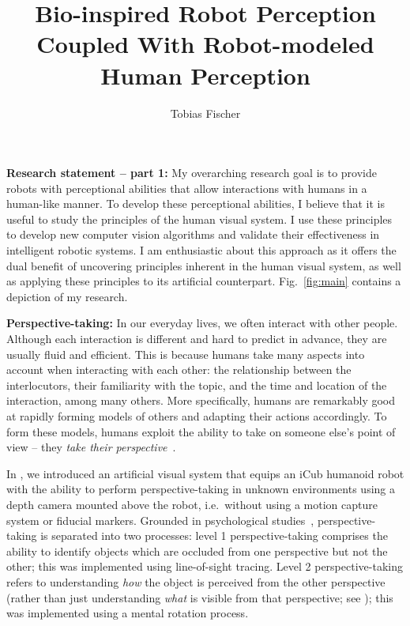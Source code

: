 \documentclass[conference]{IEEEtran}
\begin{document}
%
\title{Bio-inspired Robot Perception\\Coupled With Robot-modeled Human Perception}

%
\author{Tobias Fischer%
}

%
%
%
%
%
%
%
%
%
%
%
%
%
%
%
%


%
%


%
%
%
%
%
%
%
%
%
%
%
%
%
%
%
%


\maketitle

%
%
%

\IEEEpeerreviewmaketitle

%
\textbf{Research statement -- part 1:} My overarching research goal is to provide robots with perceptional abilities that allow interactions with humans in a human-like manner. To develop these perceptional abilities, I believe that it is useful to study the principles of the human visual system. I use these principles to develop new computer vision algorithms and validate their effectiveness in intelligent robotic systems. I am enthusiastic about this approach as it offers the dual benefit of uncovering principles inherent in the human visual system, as well as applying these principles to its artificial counterpart. Fig.~\ref{fig:main} contains a depiction of my research.

\textbf{Perspective-taking:} In our everyday lives, we often interact with other people. Although each interaction is different and hard to predict in advance, they are usually fluid and efficient. This is because humans take many aspects into account when interacting with each other: the relationship between the interlocutors, their familiarity with the topic, and the time and location of the interaction, among many others. More specifically, humans are remarkably good at rapidly forming models of others and adapting their actions accordingly. To form these models, humans exploit the ability to take on someone else's point of view -- they \emph{take their perspective}~\cite{Fischer2018PhD}. 

In \cite{Fischer2016}, we introduced an artificial visual system that equips an iCub humanoid robot with the ability to perform perspective-taking in unknown environments using a depth camera mounted above the robot, i.e.\ without using a motion capture system or fiducial markers. Grounded in psychological studies~\cite{Michelon2006,Flavell1981}, perspective-taking is separated into two processes: level 1 perspective-taking comprises the ability to identify objects which are occluded from one perspective but not the other; this was implemented using line-of-sight tracing. Level 2 perspective-taking refers to understanding \emph{how} the object is perceived from the other perspective (rather than just understanding \emph{what} is visible from that perspective; see \cite{Michelon2006}); this was implemented using a mental rotation process.
\end{document}
